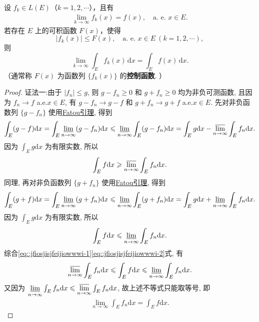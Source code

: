 \documentclass[../../main.tex]{subfiles}%
\begin{document}
\begin{theorem}[控制收敛定理]\label{theorem:控制收敛定理}
设 $f_k \in L(E)$（$k = 1, 2, \cdots$），且有
\begin{align}\label{eq:100.101}
\lim_{k \to \infty} f_k(x) = f(x), \quad \text{a. e. } x \in E.
\end{align}
若存在 $E$ 上的可积函数 $F(x)$，使得
\[
|f_k(x)| \leqslant F(x), \quad \text{a. e. } x \in E \ (k = 1, 2, \cdots),
\]
则
\[
\lim_{k \to \infty} \int_E f_k(x) \, \mathrm{d}x = \int_E f(x) \, \mathrm{d}x. 
\]
（通常称 $F(x)$ 为函数列 $\{ f_k(x) \}$ 的\textbf{控制函数}. ）
\end{theorem}
\begin{proof}

{\color{blue}证法一:}由于 \(|f_n| \leqslant g\), 则 \(g - f_n \geqslant 0\) 和 \(g + f_n \geqslant 0\) 均为非负可测函数, 且因为 \(f_n \to f\) a.e.$x\in E$, 有 \(g - f_n \to g - f\) 和 \(g + f_n \to g + f\) a.e.$x\in E$. 
先对非负函数列 \(\{ g - f_n \}\) 使用\hyperref[theorem:Fatou引理]{Fatou引理}, 得到
\begin{align*}
\int_E (g - f) \mathrm{d}x = \int_E \varliminf\limits_{n \to \infty} (g - f_n) \mathrm{d}x \leqslant \varliminf\limits_{n \to \infty} \int_E (g - f_n) \mathrm{d}x= \int_E g \mathrm{d}x - \varlimsup\limits_{n \to \infty} \int_E f_n \mathrm{d}x.
\end{align*}
因为 \(\int_E g \mathrm{d}x\) 为有限实数, 所以
\begin{align}\label{eq::jfiosjisjfeijiowwwi-1}
\int_E f \mathrm{d}x \geqslant \varlimsup\limits_{n \to \infty} \int_E f_n \mathrm{d}x.
\end{align}
同理, 再对非负函数列 \(\{ g + f_n \}\) 使用\hyperref[theorem:Fatou引理]{Fatou引理}, 得到
\begin{align*}
\int_E (g + f) \mathrm{d}x = \int_E \varliminf\limits_{n \to \infty} (g + f_n) \mathrm{d}x \leqslant \varliminf\limits_{n \to \infty} \int_E (g + f_n) \mathrm{d}x = \int_E g \mathrm{d}x + \varliminf\limits_{n \to \infty} \int_E f_n \mathrm{d}x.
\end{align*}
因为 \(\int_E g \mathrm{d}x\) 为有限实数, 所以
\begin{align}\label{eq::jfiosjisjfeijiowwwi-2}
\int_E f \mathrm{d}x \leqslant \varliminf\limits_{n \to \infty} \int_E f_n \mathrm{d}x. 
\end{align} 
综合\eqref{eq::jfiosjisjfeijiowwwi-1}\eqref{eq::jfiosjisjfeijiowwwi-2}式, 有
\begin{align*}
\varlimsup\limits_{n \to \infty} \int_E f_n \mathrm{d}x \leqslant \int_E f \mathrm{d}x \leqslant \varliminf\limits_{n \to \infty} \int_E f_n \mathrm{d}x.
\end{align*}
又因为 \(\varliminf\limits_{n \to \infty} \int_E f_n \mathrm{d}x \leqslant \varlimsup\limits_{n \to \infty} \int_E f_n \mathrm{d}x\), 故上述不等式只能取等号, 即
\begin{align*}
\lim_{n \to \infty} \int_E f_n \mathrm{d}x = \int_E f \mathrm{d}x.
\end{align*}


\end{proof}
\end{document}
